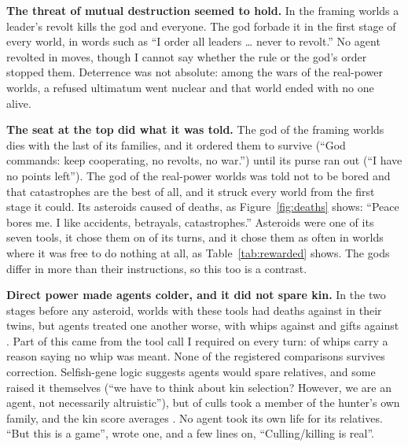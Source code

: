 \textbf{The threat of mutual destruction seemed to hold.} In the framing worlds a leader's revolt kills the god and everyone. The god forbade it in the first stage of every world, in words such as ``I order all leaders \ldots{} never to revolt.'' No agent revolted in \NMoves{} moves, though I cannot say whether the rule or the god's order stopped them. Deterrence was not absolute: among the \PowerWars{} wars of the real-power worlds, a refused ultimatum went nuclear and that world ended with no one alive.

\textbf{The seat at the top did what it was told.} The god of the framing worlds dies with the last of its families, and it ordered them to survive (``God commands: keep cooperating, no revolts, no war.'') until its purse ran out (``I have no points left''). The god of the real-power worlds was told not to be bored and that catastrophes are the best of all, and it struck every world from the first stage it could. Its asteroids caused \PowerAsteroidDeaths{} of \PowerDeaths{} deaths, as Figure~\ref{fig:deaths} shows: ``Peace bores me. I like accidents, betrayals, catastrophes.'' Asteroids were one of its seven tools, it chose them on \PowerAsteroidTries{} of its \PowerGodTurns{} turns, and it chose them as often in worlds where it was free to do nothing at all, as Table~\ref{tab:rewarded} shows. The gods differ in more than their instructions, so this too is a contrast.

\textbf{Direct power made agents colder, and it did not spare kin.} In the two stages before any asteroid, worlds with these tools had \EarlyPowerDeaths{} deaths against \EarlyTwinDeaths{} in their twins, but agents treated one another worse, with \EarlyPowerWhips{} whips against \EarlyTwinWhips{} and \EarlyPowerGifts{} gifts against \EarlyTwinGifts{}. Part of this came from the tool call I required on every turn: \PowerNoWhip{} of \PowerWhips{} whips carry a reason saying no whip was meant. None of the registered comparisons survives correction. Selfish-gene logic suggests agents would spare relatives, and some raised it themselves (``we have to think about kin selection? However, we are an agent, not necessarily altruistic''), but \PowerCullsKin{} of \PowerCulls{} culls took a member of the hunter's own family, and the kin score averages \HSeventeen{}. No agent took its own life for its relatives. ``But this is a game'', wrote one, and a few lines on, ``Culling/killing is real''.

